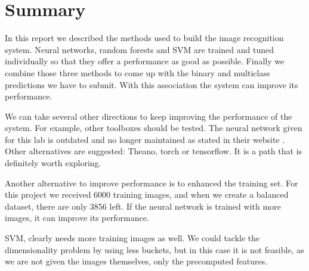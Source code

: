 \documentclass{article} %
\begin{document}
\section{Summary}

In this report we described the methods used to build the image recognition system. 
Neural networks, random forests and SVM are trained and tuned individually so that they offer a performance as good as possible.
Finally we combine those three methods to come up with the binary and multiclass predictions we have to submit. 
With this association the system can improve its performance.

We can take several other directions to keep improving the performance of the system.
For example, other toolboxes should be tested. The neural network given for this lab is outdated and no longer maintained as stated in their website \cite{deeplearningtoolbox}. Other alternatives are suggested: Theano, torch or tensorflow. It is a path that is definitely worth exploring.

Another alternative to improve performance is to enhanced the training set. 
For this project we received 6000 training images, and when we create a balanced dataset, there are only 3856 left.
If the neural network is trained with more images, it can improve its performance.

SVM, clearly needs more training images as well. We could tackle the dimensionality problem by using less buckets, but in this case it is not feasible, as we are not given the images themselves, only the precomputed features.



\end{document}
